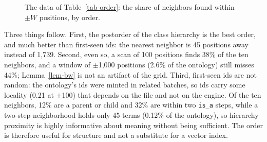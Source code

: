 \begin{table}[t]
\caption{Share of the 10 nearest neighbors (by cosine) found within $\pm W$ positions of a term, and the median position gap to the nearest neighbor. GO, 38,092 terms, 2,000 queries.}
\label{tab-order}
\small
{}
\end{table}

\begin{figure}[t]
\centering

\caption{The data of Table~\ref{tab-order}: the share of neighbors found within $\pm W$ positions, by order.}
\label{fig-order}
\end{figure}

Three things follow.
First, the postorder of the class hierarchy is the best order, and much better
than first-seen ids: the nearest neighbor is 45 positions away instead of
1,739.
Second, even so, a scan of 100 positions finds 38\% of the ten neighbors, and
a window of $\pm$1,000 positions (2.6\% of the ontology) still misses 44\%;
Lemma~\ref{lem-bw} is not an artifact of the grid.
Third, first-seen ids are not random: the ontology's ids were minted in related
batches, so ids carry some locality (0.21 at $\pm$100) that depends on the file
and not on the engine.
Of the ten neighbors, 12\% are a parent or child and 32\% are within two
\texttt{is\_a} steps, while a two-step neighborhood holds only 45 terms
(0.12\% of the ontology), so hierarchy proximity is highly informative about
meaning without being sufficient.
The order is therefore useful for structure and not a substitute for a vector
index.
